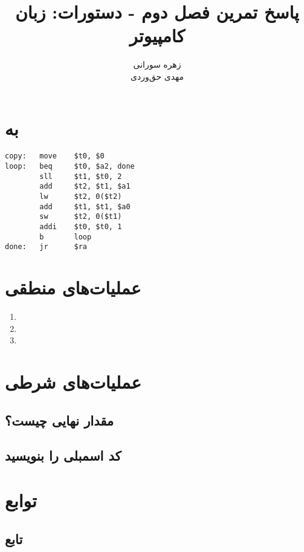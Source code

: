 \documentclass[11pt, dvipsnames, svgnames, x11names]{article}
\title{پاسخ تمرین فصل دوم - دستورات: زبان کامپیوتر}
\author{
    زهره سورانی \\
    مهدی‌ حق‌وردی}
\date{}
\begin{document}
\maketitle
\tableofcontents
\newpage
\section{ به }
\begin{latin}
\begin{lstlisting}[keywords={move, beq, sll, add, lw, sw, addi, b, jr}]
copy:   move    $t0, $0
loop:   beq     $t0, $a2, done
        sll     $t1, $t0, 2
        add     $t2, $t1, $a1
        lw      $t2, 0($t2)
        add     $t1, $t1, $a0
        sw      $t2, 0($t1)
        addi    $t0, $t0, 1
        b       loop
done:   jr      $ra
\end{lstlisting}
\end{latin}

\section{عملیات‌های منطقی}
\begin{enumerate}
\item 
{}
\item 
{}
\item 
{}
\end{enumerate}

\section{عملیات‌های شرطی }

\subsection{مقدار نهایی چیست؟}

\subsection{کد اسمبلی را بنویسید}

\section{توابع}

\subsection{تابع }
\end{document}
